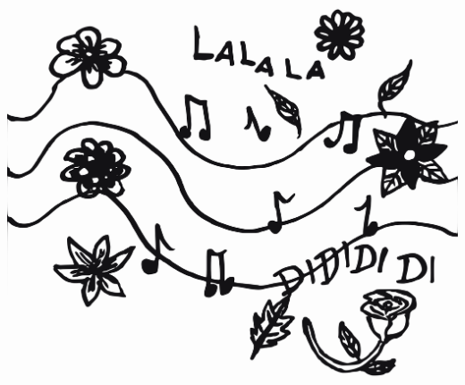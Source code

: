
\begin{intersong}
\sffamily\bfseries\LARGE{}
\begin{center}
	\vspace{20mm}
\includegraphics[width=1\textwidth]{../bilder/fardigabilder/BilderTillKapitel/lalala.png} 
\end{center}
\end{intersong}
\sclearpage
\sclearpage

